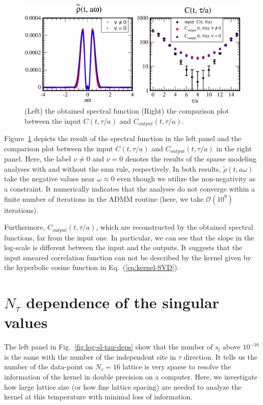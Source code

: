 \documentclass[a4paper,11pt]{article}
\begin{document}
\begin{figure}[h]
\begin{center}
\includegraphics[scale=0.55]{./rho-C-all-tau-analysis.pdf}
\caption{(Left) the obtained spectral function (Right) the comparison plot between the input $C(t,\tau/a)$ and $C_{output}(t,\tau/a)$.}
\label{fig:trash-ana}
\end{center}
\end{figure}
Figure~\ref{fig:trash-ana} depicts the result of the spectral function in the left panel and the comparison plot between the input $C(t,\tau/a)$ and $C_{output}(t,\tau/a)$ in the right panel.
Here, the label $\nu \ne 0$ and $\nu =0$ denotes the results of the sparse modeling analyses with and without the sum rule, respectively.
In both results,  $\tilde{\rho}(t,a\omega)$ take the negative values near $\omega \approx 0$ even though we utilize the non-negativity as a constraint.
It numerically indicates that the analyses do not converge within a finite number of iterations in the ADMM routine  (here, we take $\mathcal{O}(10^9)$ iterations).

Furthermore, $C_{output}(t,\tau/a)$, which are reconstructed by the obtained spectral functions, far from the input one.
In particular, we can see that the slope in the log-scale is different between the input and the outputs.
It suggests that the input smeared correlation function can not be described by the kernel given by the hyperbolic cosine function in Eq.~(\ref{eq:kernel-SVD}).




\section{$N_\tau$ dependence of the singular values}\label{sec:App-sl}
The left panel in Fig.~\ref{fig:log-sl-tau-deps} show that the number of $s_l$ above $10^{-16}$ is the same with the number of the independent site in $\tau$ direction.
It tells us the number of the data-point on $N_\tau=16$ lattice is very sparse to resolve the information of the kernel  in double precision on a computer.
Here, we investigate how large lattice size (or how fine lattice spacing) are needed to analyze the kernel at this temperature with minimal loss of information.
\end{document}
